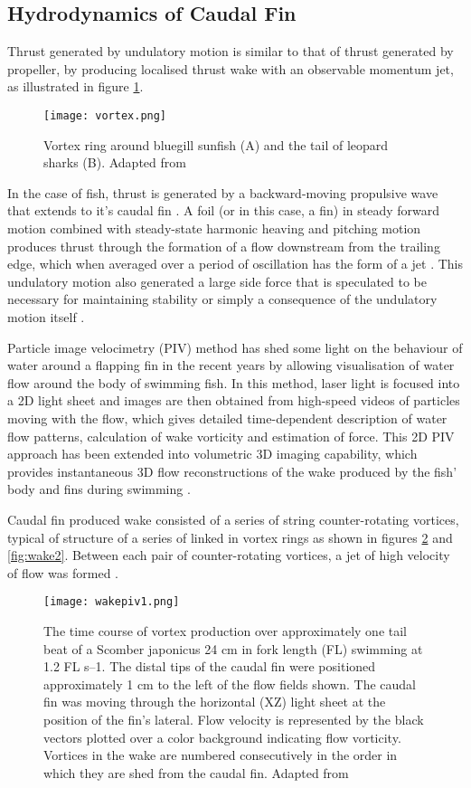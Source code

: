 \subsection{Hydrodynamics of Caudal Fin}
\label{sec:10}
Thrust generated by undulatory motion is similar to that of thrust generated by propeller, by producing localised thrust wake with an observable momentum jet, as illustrated in figure \ref{fig:vortex}.
\begin{figure}[H]
    \centering
    \texttt{[image: vortex.png]}
    \caption{Vortex ring around bluegill sunfish (A) and the tail of leopard sharks (B). Adapted from \cite{lauder1}}
    \label{fig:vortex}
\end{figure}
In the case of fish, thrust is generated by a backward-moving propulsive wave that extends to it's caudal fin \citep{sfakiotakis}. A foil (or in this case, a fin) in steady forward motion combined with steady-state harmonic heaving and pitching motion produces thrust through the formation of a flow downstream from the trailing edge, which when averaged over a period of oscillation has the form of a jet \citep{anderson}. This undulatory motion also generated a large side force that is speculated to be necessary for maintaining stability or simply a consequence of the undulatory motion itself \citep{lauder1}.\par
Particle image velocimetry (PIV) method has shed some light on the behaviour of water around a flapping fin in the recent years by allowing visualisation of water flow around the body of swimming fish. In this method, laser light is focused into a 2D light sheet and images are then obtained from high-speed videos of particles moving with the flow, which gives detailed time-dependent description of water flow patterns, calculation of wake vorticity and estimation of force. This 2D PIV approach has been extended into volumetric 3D imaging capability, which provides instantaneous 3D flow reconstructions of the wake produced by the fish' body and fins during swimming \citep{lauder2}.\par
Caudal fin produced wake consisted of a series of string counter-rotating vortices, typical of structure of a series of linked in vortex rings as shown in figures \ref{fig:wake1} and \ref{fig:wake2}. Between each pair of counter-rotating vortices, a jet of high velocity of flow was formed \citep{nauen}.\par
\begin{figure}[H]
    \centering
    \texttt{[image: wakepiv1.png]}
    \caption{The time course of vortex production over approximately one tail beat of a Scomber japonicus 24 cm in fork length (FL) swimming at 1.2 FL s–1. The distal tips of the caudal fin were positioned approximately 1 cm to the left of the flow fields shown. The caudal fin was moving through the horizontal (XZ) light sheet at the position of the fin’s lateral. Flow velocity is represented by the black vectors plotted over a color background indicating flow vorticity. Vortices in the wake are numbered consecutively in the order in which they are shed from the caudal fin. Adapted from \citet{nauen}}
    \label{fig:wake1}
\end{figure}
